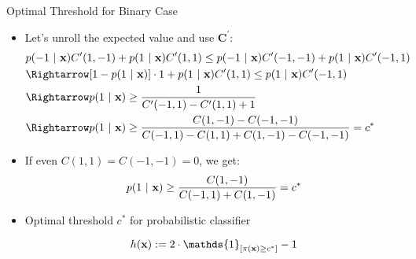 \documentclass[11pt,compress,t,notes=noshow, xcolor=table]{beamer}
\begin{document}
\begin{vbframe}{Optimal Threshold for Binary Case}
\begin{itemize}
			\item Let's unroll the expected value and use $\mathbf{C}^\prime$:
            \footnotesize{
    			\begin{align*}	
                    & p(-1 ~|~ \xv ) C^\prime(1,-1)  + 	p(1 ~|~ \xv ) C^\prime(1,1) \leq  p(-1 ~|~ \xv ) C^\prime(-1,-1)  + 	p(1 ~|~ \xv ) C^\prime(-1,1)  \\ 
                    &\Rightarrow [1 - p(1 ~|~ \xv)] \cdot 1 + p(1 ~|~ \xv) C^\prime(1, 1) \leq p(1 ~|~ \xv) C^\prime(-1, 1) \\
                    &\Rightarrow p(1 ~|~ \xv) \geq \frac{1}{C^\prime(-1, 1) - C^\prime(1, 1) + 1} \\
                    &\Rightarrow p(1 ~|~ \xv) \geq \frac{C(1, -1) - C(-1, -1)}{C(-1, 1) - C(1, 1) + C(1, -1) - C(-1, -1)} = c^*
    			\end{align*}
            }
		
            \item If even $C(1, 1) = C(-1, -1) = 0 $, we get:
            \begin{align*}
                p(1 ~|~ \mathbf{x}) \geq \frac{C(1, -1)}{C(-1, 1) + C(1, -1)} = c^{*}
            \end{align*}	
            
            \item Optimal threshold $c^*$ for probabilistic classifier 
            
            $$   \hx := 2 \cdot \mathds{1}_{[ \pi(\xv) \geq c^*]} -1 $$
							
		\end{itemize}
\end{vbframe}
\end{document}
